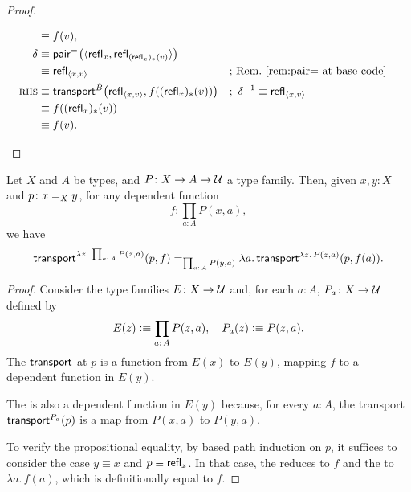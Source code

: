 \begin{proof}
\begin{description}[font=\normalfont\scshape]
\begin{align*}
                &\equiv f(v),\\
            \delta&\equiv\mathsf{pair}^{\mathrel{=_{}}}\bigl(
                    \langle\mathsf{refl}_x,
                    \mathsf{refl}_{(\mathsf{refl}_x)_*(v)}\rangle
                \bigr)\\
                &\equiv\mathsf{refl}_{\langle x,v\rangle}
                    &&\text{; Rem.~\ref{rem:pair=-at-base-code}}\\
            \textsc{rhs}
            &\equiv
                \mathsf{transport}^{\hat B}
                    \bigl(\mathsf{refl}_{\langle x,v\rangle},f((\mathsf{refl}_x)_*(v))\bigr)
                &&;\ \delta^{-1}\equiv\mathsf{refl}_{\langle x,v\rangle}\\
            &\equiv f((\mathsf{refl}_x)_*(v))\\
            &\equiv f(v).
        \end{align*}\qedhere
    \end{description}
\end{proof}

\begin{prop}\label{prop:transport-pointwise-evaluation}
    Let\/ $X$ and\/ $A$ be types, and\/ $P\colon X\to A\to\univ$ a type family. Then, given\/ $x,y\colon X$ and\/ $p\colon x\eq{X}y$, for any dependent function
    \[
        f\colon \prod_{a\colon A}P(x,a),
    \]
    we have
    \[
        \fun{transport}^{
            \lambda z.\,\prod_{a\colon A}P(z,a)
            }(p,f)
        \eq{\prod_{a\colon A}P(y,a)}
        \lambda a.\,\fun{transport}^{\lambda z.\,P(z,a)}
            (p,f(a)).
    \]
\end{prop}

\begin{proof}
    Consider the type families $E\colon X\to\univ$ and, for each $a\colon A$, $P_a\colon X\to\univ$ defined by
    \[
        E(z) \defeq \prod_{a\colon A}P(z,a), \quad P_a(z) \defeq P(z,a).
    \]
    The \lhs $\mathsf{transport}$ at $p$ is a function from $E(x)$ to $E(y)$, mapping $f$ to a dependent function in $E(y)$.

    The \rhs is also a dependent function in $E(y)$ because, for every $a\colon A$, the transport $\mathsf{transport}^{P_a}(p)$ is a map from $P(x,a)$ to $P(y,a)$. 

    To verify the propositional equality, by based path induction on $p$, it suffices to consider the case $y\equiv x$ and $p\equiv\mathsf{refl}_x$. In that case, the \lhs reduces to $f$ and the \rhs to $\lambda a.\,f(a)$, which is definitionally equal to $f$.
\end{proof}

